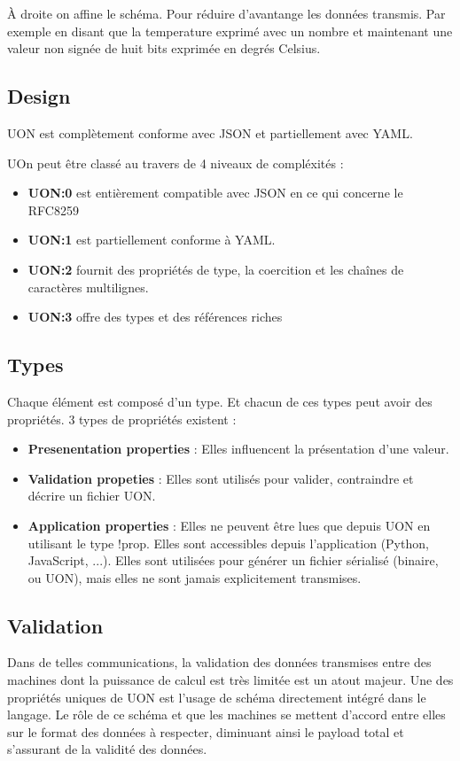 \documentclass[
    iict, %
    il, %
]{heig-tb}
\begin{document}
À droite on affine le schéma. Pour réduire d'avantange les données transmis.
Par exemple en disant que la temperature exprimé avec un nombre et maintenant une valeur non signée de huit bits exprimée en degrés Celsius.

\subsection{Design}
UON est complètement conforme avec JSON et partiellement avec YAML.

UOn peut être classé au travers de 4 niveaux de compléxités :
\begin{itemize}
    \item \textbf{UON:0} est entièrement compatible avec JSON en ce qui concerne le RFC8259
    \item \textbf{UON:1} est partiellement conforme à YAML.
    \item \textbf{UON:2} fournit des propriétés de type, la coercition et les chaînes de caractères multilignes.
    \item \textbf{UON:3} offre des types et des références riches
\end{itemize}

\subsection{Types}
Chaque élément est composé d'un type. Et chacun de ces types peut avoir des propriétés.
3 types de propriétés existent :
\begin{itemize}
    \item \textbf{Presenentation properties} : Elles influencent la présentation d'une valeur.
    \item \textbf{Validation propeties} : Elles sont utilisés pour valider, contraindre et décrire un fichier UON.
    \item \textbf{Application properties} : Elles ne peuvent être lues que depuis UON en utilisant le type !prop. Elles sont accessibles depuis l'application (Python, JavaScript, ...). Elles sont utilisées pour générer un fichier sérialisé (binaire, ou UON), mais elles ne sont jamais explicitement transmises.
\end{itemize}

\subsection{Validation}
Dans de telles communications, la validation des données transmises entre des machines dont la puissance de calcul est très limitée est un atout majeur.
Une des propriétés uniques de UON est l'usage de schéma directement intégré dans le langage.
Le rôle de ce schéma et que les machines se mettent d'accord entre elles sur le format des données à respecter, diminuant ainsi le payload total et s'assurant de la validité des données.
\end{document}

